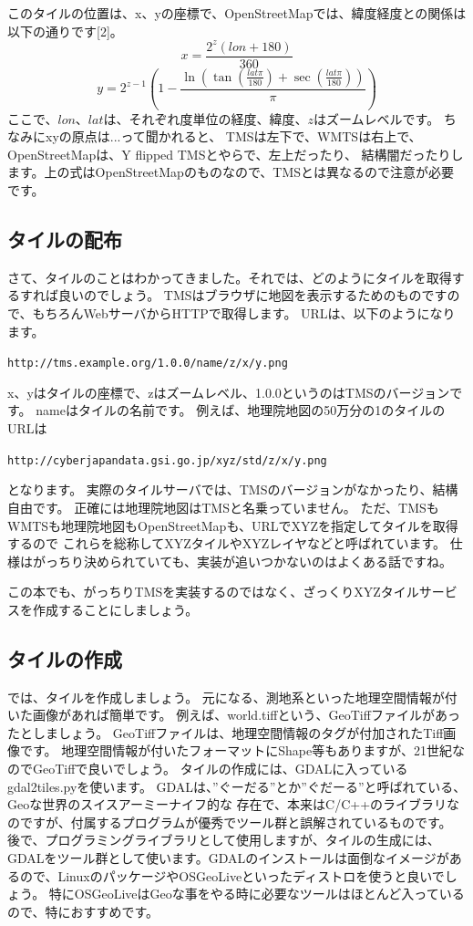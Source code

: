 このタイルの位置は、x、yの座標で、OpenStreetMapでは、緯度経度との関係は以下の通りです[2]。
\[
x = \frac{2^z(lon+180)}{360}
\]
\[
y = 2^{z-1}(1-\frac{\ln(\tan(\frac{lat\pi}{180})+\sec(\frac{lat\pi}{180}))}{\pi})
\]
ここで、$lon$、$lat$は、それぞれ度単位の経度、緯度、$z$はズームレベルです。
ちなみにxyの原点は...って聞かれると、
TMSは左下で、WMTSは右上で、OpenStreetMapは、Y flipped TMSとやらで、左上だったり、
結構闇だったりします。上の式はOpenStreetMapのものなので、TMSとは異なるので注意が必要です。

\subsection*{タイルの配布}
さて、タイルのことはわかってきました。それでは、どのようにタイルを取得するすれば良いのでしょう。
TMSはブラウザに地図を表示するためのものですので、もちろんWebサーバからHTTPで取得します。
URLは、以下のようになります。
\begin{center}
  \texttt{http://tms.example.org/1.0.0/name/z/x/y.png}
\end{center}

x、yはタイルの座標で、zはズームレベル、1.0.0というのはTMSのバージョンです。
nameはタイルの名前です。
例えば、地理院地図の50万分の1のタイルのURLは
\begin{center}
  \texttt{http://cyberjapandata.gsi.go.jp/xyz/std/z/x/y.png}
\end{center}
となります。
実際のタイルサーバでは、TMSのバージョンがなかったり、結構自由です。
正確には地理院地図はTMSと名乗っていません。
ただ、TMSもWMTSも地理院地図もOpenStreetMapも、URLでXYZを指定してタイルを取得するので
これらを総称してXYZタイルやXYZレイヤなどと呼ばれています。
仕様はがっちり決められていても、実装が追いつかないのはよくある話ですね。

この本でも、がっちりTMSを実装するのではなく、ざっくりXYZタイルサービスを作成することにしましょう。

\subsection*{タイルの作成}
では、タイルを作成しましょう。
元になる、測地系といった地理空間情報が付いた画像があれば簡単です。
例えば、world.tiffという、GeoTiffファイルがあったとしましょう。
GeoTiffファイルは、地理空間情報のタグが付加されたTiff画像です。
地理空間情報が付いたフォーマットにShape等もありますが、21世紀なのでGeoTiffで良いでしょう。
タイルの作成には、GDALに入っているgdal2tiles.pyを使います。
GDALは、''ぐーだる''とか''ぐだーる''と呼ばれている、Geoな世界のスイスアーミーナイフ的な
存在で、本来はC/C++のライブラリなのですが、付属するプログラムが優秀でツール群と誤解されているものです。
後で、プログラミングライブラリとして使用しますが、タイルの生成には、GDALをツール群として使います。GDALのインストールは面倒なイメージがあるので、LinuxのパッケージやOSGeoLiveといったディストロを使うと良いでしょう。
特にOSGeoLiveはGeoな事をやる時に必要なツールはほとんど入っているので、特におすすめです。

